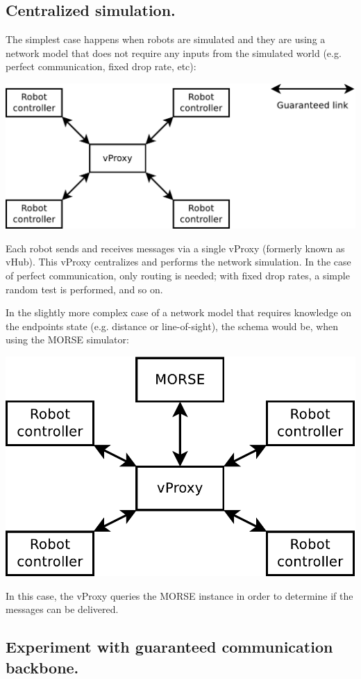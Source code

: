 \documentclass[a4paper,11pt]{article}
\begin{document}
\subsection{Centralized simulation.}

The simplest case happens when robots are simulated and they are using a network model that does not require any inputs from the simulated world (e.g. perfect communication, fixed drop rate, etc):

\begin{center}
\includegraphics[width=0.666\columnwidth]{figures/central}
\end{center}

Each robot sends and receives messages via a single vProxy (formerly known as vHub). This vProxy centralizes and performs the network simulation. In the case of perfect communication, only routing is needed; with fixed drop rates, a simple random test is performed, and so on.

In the slightly more complex case of a network model that requires knowledge on the endpoints state (e.g. distance or line-of-sight), the schema would be, when using the MORSE simulator:

\begin{center}
\includegraphics[width=0.666\columnwidth]{figures/central+morse}
\end{center}

In this case, the vProxy queries the MORSE instance in order to determine if the messages can be delivered.

\subsection{Experiment with guaranteed communication backbone.}
\end{document}

